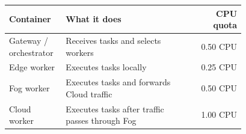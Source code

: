 \begin{table}[H]
\centering
\label{table:topology:start}
\begin{tabular}{p{0.24\linewidth}p{0.54\linewidth}r}
\toprule
\textbf{Container} & \textbf{What it does} & \textbf{CPU quota} \\
\midrule
Gateway / orchestrator & Receives tasks and selects workers & 0.50 CPU \\
Edge worker & Executes tasks locally & 0.25 CPU \\
Fog worker & Executes tasks and forwards Cloud traffic & 0.50 CPU \\
Cloud worker & Executes tasks after traffic passes through Fog & 1.00 CPU \\
\bottomrule
\end{tabular}
\label{table:topology:end}
\end{table}
